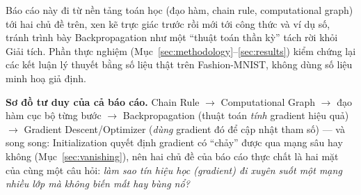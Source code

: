 \documentclass[12pt,a4paper]{report}
\begin{document}
Báo cáo này đi từ nền tảng toán học (đạo hàm, chain rule, computational
graph) tới hai chủ đề trên, xen kẽ trực giác trước rồi mới tới công thức và
ví dụ số, tránh trình bày Backpropagation như một ``thuật toán thần kỳ''
tách rời khỏi Giải tích. Phần thực nghiệm (Mục~\ref{sec:methodology}--\ref{sec:results})
kiểm chứng lại các kết luận lý thuyết bằng số liệu thật trên Fashion-MNIST,
không dùng số liệu minh hoạ giả định.

\par\noindent\textbf{Sơ đồ tư duy của cả báo cáo.}\enspace 
Chain Rule $\to$ Computational Graph $\to$ đạo hàm cục bộ từng bước $\to$
Backpropagation (thuật toán \emph{tính} gradient hiệu quả) $\to$ Gradient
Descent/Optimizer (\emph{dùng} gradient đó để cập nhật tham số) --- và song
song: Initialization quyết định gradient có ``chảy'' được qua mạng sâu hay
không (Mục~\ref{sec:vanishing}), nên hai chủ đề của báo cáo thực chất là
hai mặt của cùng một câu hỏi: \emph{làm sao tín hiệu học (gradient) đi
xuyên suốt một mạng nhiều lớp mà không biến mất hay bùng nổ?}
\par
\clearpage
\end{document}
